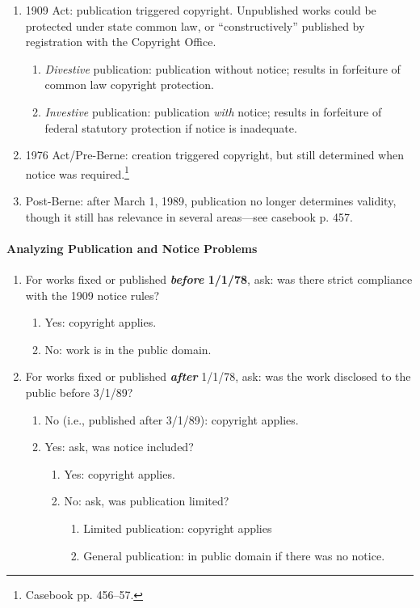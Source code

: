 \begin{enumerate}
    \item 1909 Act: publication triggered copyright. Unpublished works could 
    be protected under state common law, or ``constructively'' published by 
    registration with the Copyright Office.
    \begin{enumerate}
        \item \emph{Divestive} publication: publication without notice; 
        results in forfeiture of common law copyright protection. 
        \item \emph{Investive} publication: publication \emph{with} 
        notice; results in forfeiture of federal statutory protection if 
        notice is inadequate.
    \end{enumerate}
    \item 1976 Act/Pre-Berne: creation triggered copyright, but still 
    determined when notice was required.\footnote{Casebook pp. 456--57.}
    \item Post-Berne: after March 1, 1989, publication no longer determines 
    validity, though it still has relevance in several areas---see casebook p. 
    457.
\end{enumerate}

\paragraph{Analyzing Publication and Notice Problems}

\begin{enumerate}
    \item For works fixed or published \textbf{\emph{before} 1/1/78}, ask: was 
    there strict compliance with the 1909 notice rules?
    \begin{enumerate}
        \item Yes: copyright applies.
        \item No: work is in the public domain.
    \end{enumerate}
    \item For works fixed or published \textbf{\emph{after}} 1/1/78, ask: was 
    the work disclosed to the public before 3/1/89?
    \begin{enumerate}
        \item No (i.e., published after 3/1/89): copyright applies.
        \item Yes: ask, was notice included?
        \begin{enumerate}
            \item Yes: copyright applies.
            \item No: ask, was publication limited?
            \begin{enumerate}
                \item Limited publication: copyright applies
                \item General publication: in public domain if there was no 
                notice. 
            \end{enumerate}
        \end{enumerate}
    \end{enumerate}
\end{enumerate}

